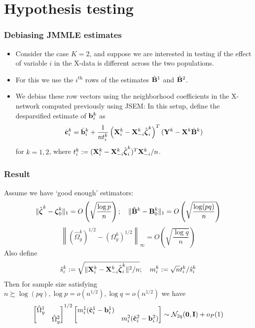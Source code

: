 \documentclass[10pt]{beamer}
\theoremstyle{definition}
\begin{document}
\section{Hypothesis testing}
\begin{frame}
\frametitle{Debiasing JMMLE estimates}

\begin{itemize}
\item Consider the case $K=2$, and suppose we are interested in testing if the effect of variable $i$ in the X-data is different across the two populations.
\vspace{1em}

\item For this we use the $i^{\text{th}}$ rows of the estimates $\hat {{\mathbf{B}}}^1$ and $\hat {{\mathbf{B}}}^2$.
\vspace{1em}

\item We debias these row vectors using the neighborhood coefficients in the X-network computed previously using JSEM:
%
In this setup, define the desparsified estimate of ${\bf{b}}_i^k$ as
%
\begin{align*}
\hat {{\bf{c}}}_i^k = \hat {{\bf{b}}}_i^k + \frac{1}{n t_i^k} \left( {\mathbf{X}}_i^k - {\mathbf{X}}_{-i}^k \hat {{\boldsymbol{\zeta}}}_i^k \right)^T
({\mathbf{Y}}^k - {\mathbf{X}}^k \hat {{\mathbf{B}}}^k )
\end{align*}
%
for $k = 1,2$, where $t_i^k := ( {\mathbf{X}}_i^k - {\mathbf{X}}_{-i}^k \hat {{\boldsymbol{\zeta}}}_i^k )^T {\mathbf{X}}_{-i}^k/n$.
\end{itemize}

\end{frame}

\begin{frame}
\frametitle{Result}
Assume we have `good enough' estimators:
%
\[
\| \hat {{\boldsymbol{\zeta}}}^k - {\boldsymbol{\zeta}}_0^k \|_1 = O \left( \sqrt { \frac{\log p}{n}} \right); \quad
\| \hat {{\mathbf{B}}}^k - {\mathbf{B}}^k_0 \|_1 = O \left( \sqrt{\frac{\log (pq)}{n}} \right)
\]
\[
\left\| (\hat \Omega_y^k)^{1/2} - (\Omega_y^k)^{1/2} \right\|_\infty = O \left( \sqrt { \frac{\log q}{n}} \right)
\]
%
Also define
%
\[
\hat s_i^k := \sqrt{\| {\mathbf{X}}_i^k - {\mathbf{X}}_{-i}^k \hat {{\boldsymbol{\zeta}}}_i^k \|^2/n}; \quad
m_i^k := \sqrt n t_i^k / \hat s_i^k
\]
%
Then for sample size satisfying $n \succsim \log (pq), \log p = o(n^{1/2}), \log q = o(n^{1/2})$ we have
%
\begin{align*}
\begin{bmatrix}
\hat \Omega_y^1 &\\
& \hat \Omega_y^2
\end{bmatrix}^{1/2}
%
\begin{bmatrix}
m_i^1 (\hat \bfc_i^1 - \bfb_i^1) &\\
&  m_i^2 (\hat \bfc_i^2 - \bfb_i^2)
\end{bmatrix}
\sim \cN_{2q} ({\bf 0}, \bfI) + o_P(1)
\end{align*}

\end{frame}
\end{document}
